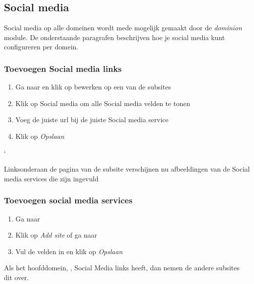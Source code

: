 \subsection{Social media}\label{socialmedia}
Social media op alle domeinen wordt mede mogelijk gemaakt door de \emph{dominion} module. 
De onderstaande paragrafen beschrijven hoe je social media kunt configureren per domein. 

\subsubsection{Toevoegen Social media links}

\begin{enumerate}
\item Ga naar   en klik op bewerken op een van de subsites
\item Klik op Social media om alle Social media velden te tonen
\item Voeg de juiste url bij de juiste Social media service
\item Klik op \emph{Opslaan}
\end{enumerate}`

Linksonderaan de pagina van de subsite verschijnen nu afbeeldingen van de Social media services die zijn ingevuld

\subsubsection{Toevoegen social media services}

\begin{enumerate}
\item Ga naar   
\item Klik op \emph{Add site} of ga naar 
\item Vul de velden in en klik op \emph{Opslaan}
\end{enumerate}

Als het hoofddomein, \drupalpath, Social Media links heeft, dan nemen de andere subsites dit over.